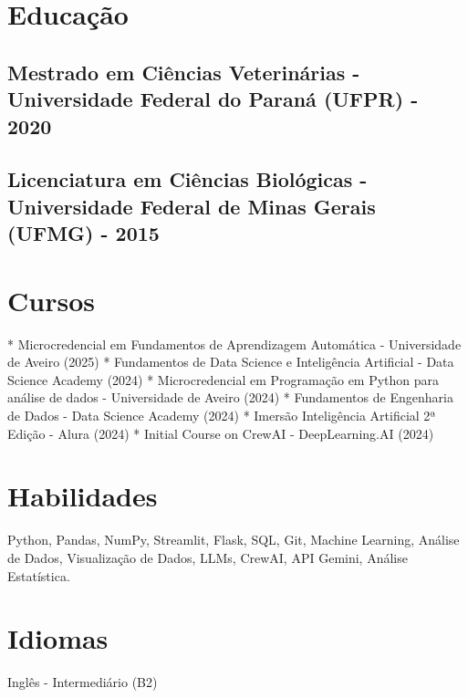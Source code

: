 \documentclass{article}
\begin{document}
\section*{Educação}
\subsection*{Mestrado em Ciências Veterinárias - Universidade Federal do Paraná (UFPR) - 2020}
\subsection*{Licenciatura em Ciências Biológicas - Universidade Federal de Minas Gerais (UFMG) - 2015}

\section*{Cursos}
* Microcredencial em Fundamentos de Aprendizagem Automática - Universidade de Aveiro (2025)
* Fundamentos de Data Science e Inteligência Artificial - Data Science Academy (2024)
* Microcredencial em Programação em Python para análise de dados - Universidade de Aveiro (2024)
* Fundamentos de Engenharia de Dados - Data Science Academy (2024)
* Imersão Inteligência Artificial 2ª Edição - Alura (2024)
* Initial Course on CrewAI - DeepLearning.AI (2024)

\section*{Habilidades}
Python, Pandas, NumPy, Streamlit, Flask, SQL, Git, Machine Learning, Análise de Dados, Visualização de Dados, LLMs, CrewAI, API Gemini, Análise Estatística.

\section*{Idiomas}
Inglês - Intermediário (B2)
\end{document}
